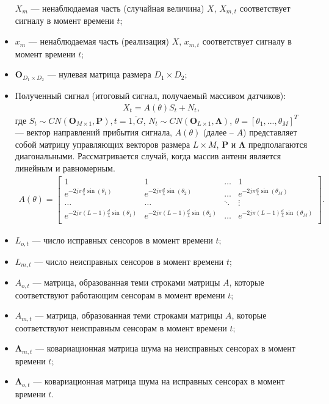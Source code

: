 \documentclass[11pt]{article}
\begin{document}
\begin{itemize}
$X_m$ --- ненаблюдаемая часть (случайная величина) $X$, $X_{m,t}$ соответствует сигналу в момент времени $t$;
\item
$x_m$ --- ненаблюдаемая часть (реализация) $X$, $x_{m,t}$ соответствует сигналу в момент времени $t$;
\item
$\mathbf{O}_{D_1 \times D_2}$ --- нулевая матрица размера $D_1 \times D_2$;
\item
Полученный сигнал (итоговый сигнал, получаемый массивом датчиков):
\begin{equation}
\begin{gathered}
X_t=A(\theta)S_t+N_t,
\end{gathered}
\end{equation}
где $S_t \sim CN(\mathbf{O}_{M \times 1},\mathbf{P}),t=\overline{1,G}$, $N_t \sim CN(\mathbf{O}_{L \times 1}, \mathbf{\Lambda})$,  $\theta=[\theta_1,...,\theta_M]^T$ --- вектор направлений прибытия сигнала, $A(\theta)$ (далее -- $A$) представляет собой матрицу управляющих векторов размера $L \times M$, $\mathbf{P}$ и $\mathbf{\Lambda}$ предполагаются диагональными. Рассматривается случай, когда массив антенн является линейным и равномерным.
\begin{gather}
A(\theta) = \begin{bmatrix}
1&1&\dots&1\\
e^{-2j\pi \frac{d}{\lambda}\sin(\theta_1)}& e^{-2j\pi \frac{d}{\lambda}\sin(\theta_2)}&\dots&e^{-2j\pi \frac{d}{\lambda}\sin(\theta_M)}\\
\dots&\dots&\ddots&\vdots\\
e^{-2j\pi (L-1) \frac{d}{\lambda}\sin(\theta_1)}& e^{-2j\pi (L-1) \frac{d}{\lambda}\sin(\theta_2)}&\dots&e^{-2j\pi (L-1) \frac{d}{\lambda}\sin(\theta_M)}\\
\end{bmatrix}.
\nonumber
\end{gather}
\end{itemize}
\begin{itemize}
\item
$L_{o,t}$ --- число исправных сенсоров в момент времени $t$;
\item
 $L_{m,t}$ --- число неисправных сенсоров в момент времени $t$;
\item 
$A_{o,t}$ --- матрица, образованная теми строками матрицы $A$, которые соответствуют работающим сенсорам в момент времени $t$; 
\item
$A_{m,t}$ --- матрица, образованная теми строками матрицы $A$, которые соответствуют неисправным сенсорам в момент времени $t$;
\item
$\mathbf{\Lambda}_{m,t}$ --- ковариационная матрица шума на неисправных сенсорах в момент времени $t$;
\item 
 $\mathbf{\Lambda}_{o,t}$ --- ковариационная матрица шума на исправных сенсорах в момент времени $t$.
\end{itemize}
\end{document}
